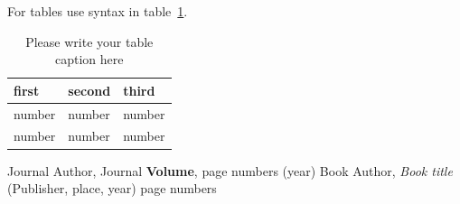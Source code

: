 \documentclass{webofc}
\begin{document}
For tables use syntax in table~\ref{tab-1}.
\begin{table}
\centering
\caption{Please write your table caption here}
\label{tab-1}       %
\begin{tabular}{lll}
\hline
first & second & third  \\\hline
number & number & number \\
number & number & number \\\hline
\end{tabular}
\vspace*{5cm}  %
\end{table}
%
% 
%
%
\begin{thebibliography}{}
%
%
Journal Author, Journal \textbf{Volume}, page numbers (year)
Book Author, \textit{Book title} (Publisher, place, year) page numbers
\end{thebibliography}
\end{document}

